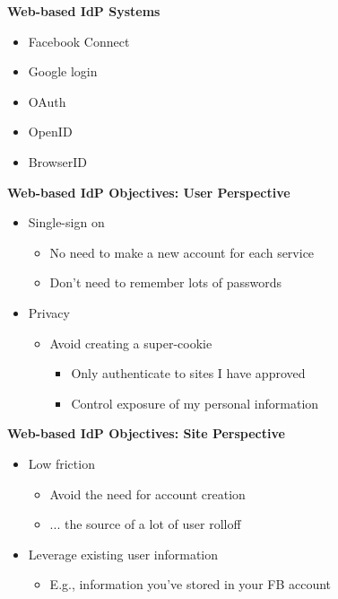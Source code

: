 \documentclass[helvetica]{seminar}
\newcommand{\heading}[1]{%
  \begin{center} 
    \large\bf 
    #1 
  \end{center} 
  \vspace{.4 in}}
\begin{document}
\begin{slide}
\heading{Web-based IdP Systems}

\begin{itemize}
\item Facebook Connect
\item Google login
\item OAuth
\item OpenID
\item BrowserID
\end{itemize}

\end{slide}


\begin{slide}
\heading{Web-based IdP Objectives: User Perspective}

\begin{itemize}
\item Single-sign on
  \begin{itemize}
  \item No need to make a new account for each service
  \item Don't need to remember lots of passwords
  \end{itemize}

\item Privacy
  \begin{itemize}
  \item Avoid creating a super-cookie
    \begin{itemize}
    \item Only authenticate to sites I have approved
    \item Control exposure of my personal information
    \end{itemize}
  \end{itemize}
\end{itemize}
\end{slide}


\begin{slide}
\heading{Web-based IdP Objectives: Site Perspective}

\begin{itemize}
\item Low friction
  \begin{itemize}
  \item Avoid the need for account creation
  \item ... the source of a lot of user rolloff
  \end{itemize}

\item Leverage existing user information
  \begin{itemize}
  \item E.g., information you've stored in your FB account
  \end{itemize}
\end{itemize}
\end{slide}
\end{document}
